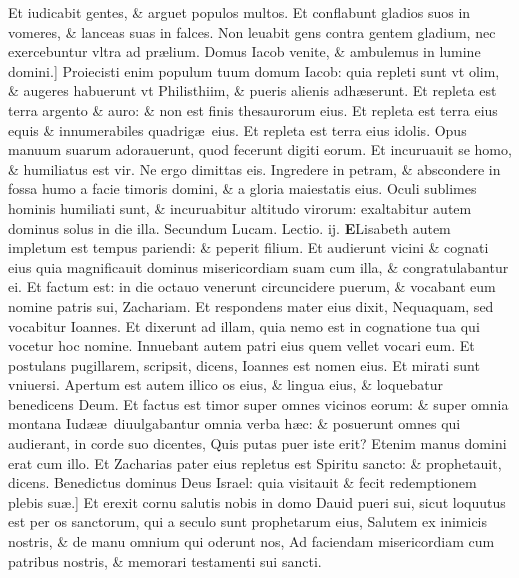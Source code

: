 \documentclass[a5paper,10pt]{book}
\def\leftmarginnote{%
	\lrmarginnote{\hskip -\marginparsep \hskip -6.5em}}
\def\rightmarginnote{%
	\lrmarginnote{\hskip\columnwidth \hskip -1em}}
\def\ae{æ}
\begin{document}
\begin{multicols*}{2}
Et iudicabit gentes, \& arguet populos multos. Et conflabunt gladios suos in vomeres, \& lanceas suas in falces.
Non leuabit gens contra gentem gladium, nec exercebuntur vltra ad pr\ae lium.
Domus Iacob venite, \& ambulemus in lumine domini.]
Proiecisti\leftmarginnote{\begin{flushright}B\end{flushright}} enim populum tuum domum Iacob: quia repleti sunt vt olim, \& augeres habuerunt vt Philisthiim, \& pueris alienis adh\ae serunt.
Et repleta est terra argento \& auro: \& non est finis thesaurorum eius. Et repleta est terra eius equis \& innumerabiles quadrig\ae \ eius. Et repleta est terra eius idolis.
Opus manuum suarum adorauerunt, quod fecerunt digiti eorum. Et incuruauit se homo, \& humiliatus est vir.
Ne ergo dimittas eis.
Ingredere in petram, \& abscondere in fossa humo a facie timoris domini, \& a gloria maiestatis eius.
Oculi sublimes hominis humiliati sunt, \& incuruabitur altitudo virorum: exaltabitur autem dominus solus in die illa.
\fancyhead[C]{\color{red} Feria. iij. Dominic\ae . j. aduentus}
\color{red} Secundum Lucam. \hfill Lectio. ij.\color{black}
\vspace{-.25em}
\lettrine[lines=2]{\bfseries \color{red} E}{}\textdagger Lisabeth\rightmarginnote{c.1.f} autem impletum est tempus pariendi: \& peperit filium.
Et audierunt vicini \& cognati eius quia magnificauit dominus misericordiam suam cum illa, \& congratulabantur ei.
Et factum est: in die octauo venerunt circuncidere puerum, \& vocabant eum nomine patris sui, Zachariam.
Et respondens mater eius dixit, Nequaquam, sed vocabitur Ioannes.
Et dixerunt ad illam, quia nemo est in cognatione tua qui vocetur hoc nomine.
Innuebant autem patri eius quem vellet vocari eum.
Et postulans pugillarem, scripsit, dicens, Ioannes est nomen eius. Et mirati sunt vniuersi.
Apertum est autem illico os eius, \& lingua eius, \& loquebatur benedicens Deum.
Et factus est timor super omnes vicinos eorum: \& super omnia montana Iud\ae \ae \ diuulgabantur omnia verba h\ae c: \& posuerunt omnes qui audierant, in corde suo dicentes, Quis putas puer iste erit? Etenim manus domini erat cum illo.
Et Zacharias pater eius repletus est Spiritu sancto: \& prophetauit, dicens.
Benedictus dominus Deus Israel: quia visitauit \& fecit redemptionem plebis su\ae .]
Et erexit cornu salutis nobis in domo Dauid pueri sui, sicut loquutus est per os sanctorum, qui a seculo sunt prophetarum eius, Salutem ex inimicis nostris, \& de manu omnium qui oderunt nos, Ad faciendam misericordiam cum patribus nostris, \& memorari testamenti sui sancti.

\end{multicols*}
\end{document}

